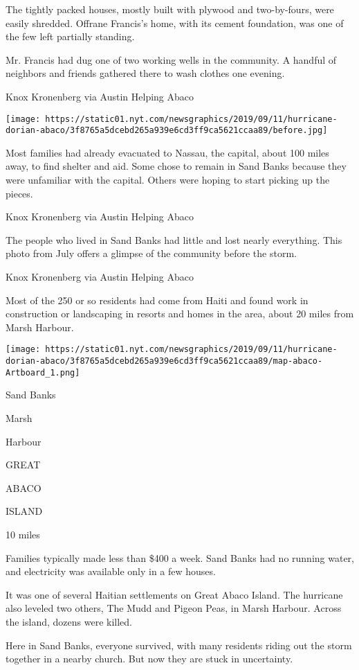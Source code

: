 The tightly packed houses, mostly built with plywood and two-by-fours,
were easily shredded. Offrane Francis's home, with its cement
foundation, was one of the few left partially standing.

Mr. Francis had dug one of two working wells in the community. A handful
of neighbors and friends gathered there to wash clothes one evening.

Knox Kronenberg via Austin Helping Abaco

\texttt{[image: https://static01.nyt.com/newsgraphics/2019/09/11/hurricane-dorian-abaco/3f8765a5dcebd265a939e6cd3ff9ca5621ccaa89/before.jpg]}

Most families had already evacuated to Nassau, the capital, about 100
miles away, to find shelter and aid. Some chose to remain in Sand Banks
because they were unfamiliar with the capital. Others were hoping to
start picking up the pieces.

Knox Kronenberg via Austin Helping Abaco

The people who lived in Sand Banks had little and lost nearly
everything. This photo from July offers a glimpse of the community
before the storm.

Knox Kronenberg via Austin Helping Abaco

Most of the 250 or so residents had come from Haiti and found work in
construction or landscaping in resorts and homes in the area, about 20
miles from Marsh Harbour.

\texttt{[image: https://static01.nyt.com/newsgraphics/2019/09/11/hurricane-dorian-abaco/3f8765a5dcebd265a939e6cd3ff9ca5621ccaa89/map-abaco-Artboard\_1.png]}

Sand Banks

Marsh

Harbour

GREAT

ABACO

ISLAND

10 miles

Families typically made less than \$400 a week. Sand Banks had no
running water, and electricity was available only in a few houses.

 It was one of several Haitian settlements on Great Abaco Island. The
hurricane also leveled two others, The Mudd and Pigeon Peas, in Marsh
Harbour. Across the island, dozens were killed.

Here in Sand Banks, everyone survived, with many residents riding out
the storm together in a nearby church. But now they are stuck in
uncertainty.

